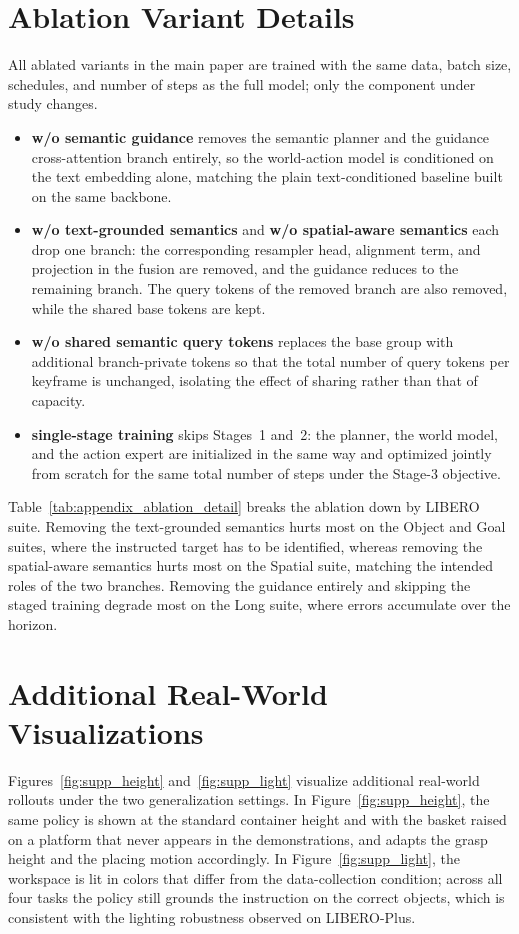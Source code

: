 \section{Ablation Variant Details}
\label{sec:appendix_ablation}

All ablated variants in the main paper are trained with the same data, batch
size, schedules, and number of steps as the full model; only the component
under study changes.
\begin{itemize}
    \item \textbf{w/o semantic guidance} removes the semantic planner and the
    guidance cross-attention branch entirely, so the world-action model is
    conditioned on the text embedding alone, matching the plain text-conditioned
    baseline built on the same backbone.
    \item \textbf{w/o text-grounded semantics} and
    \textbf{w/o spatial-aware semantics} each drop one branch: the
    corresponding resampler head, alignment term, and projection in the fusion
    are removed, and the guidance reduces to the remaining branch.
    The query tokens of the removed branch are also removed, while the shared
    base tokens are kept.
    \item \textbf{w/o shared semantic query tokens} replaces the base group
    with additional branch-private tokens so that the total number of query
    tokens per keyframe is unchanged, isolating the effect of sharing rather
    than that of capacity.
    \item \textbf{single-stage training} skips Stages~1 and~2: the planner,
    the world model, and the action expert are initialized in the same way and
    optimized jointly from scratch for the same total number of steps under the
    Stage-3 objective.
\end{itemize}

Table~\ref{tab:appendix_ablation_detail} breaks the ablation down by LIBERO
suite.
Removing the text-grounded semantics hurts most on the Object and Goal suites,
where the instructed target has to be identified, whereas removing the
spatial-aware semantics hurts most on the Spatial suite, matching the intended
roles of the two branches.
Removing the guidance entirely and skipping the staged training degrade most on
the Long suite, where errors accumulate over the horizon.


\section{Additional Real-World Visualizations}
\label{sec:appendix_vis}


Figures~\ref{fig:supp_height} and~\ref{fig:supp_light} visualize additional
real-world rollouts under the two generalization settings.
In Figure~\ref{fig:supp_height}, the same policy is shown at the standard
container height and with the basket raised on a platform that never appears in
the demonstrations, and \ourmethod adapts the grasp height and the placing
motion accordingly.
In Figure~\ref{fig:supp_light}, the workspace is lit in colors that differ
from the data-collection condition; across all four tasks the policy still
grounds the instruction on the correct objects, which is consistent with the
lighting robustness observed on LIBERO-Plus.


